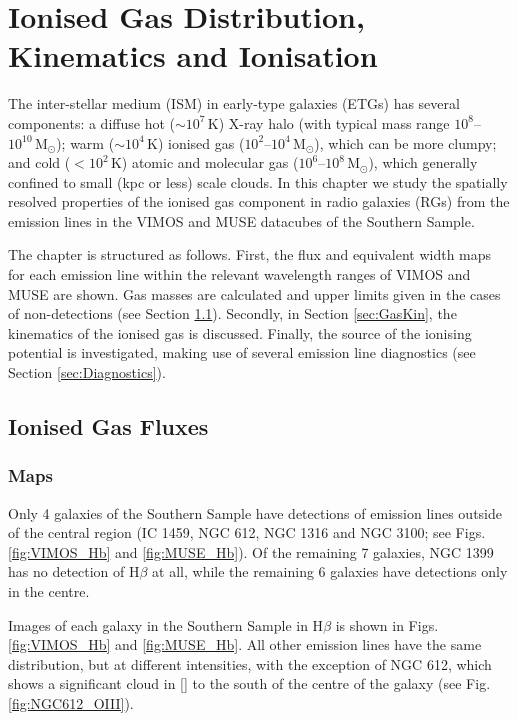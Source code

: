 \chapter{Ionised Gas Distribution, Kinematics and Ionisation}
	\label{cha:gas}
The inter-stellar medium (ISM) in early-type galaxies (ETGs) has several components: a diffuse hot ($\sim 10^7 \, \mathrm{K}$) X-ray halo (with typical mass range $10^8$--$10^{10} \, \mathrm{M_\odot}$); warm ($\sim 10^4 \, \mathrm{K}$) ionised gas ($10^2$--$10^4 \, \mathrm{M_\odot}$), which can be more clumpy; and cold ($<10^2 \, \mathrm{K}$) atomic and molecular gas ($10^6$--$10^8 \, \mathrm{M_\odot}$), which generally confined to small (kpc or less) scale clouds. In this chapter we study the spatially resolved properties of the ionised gas component in radio galaxies (RGs) from the emission lines in the VIMOS and MUSE datacubes of the Southern Sample.

The chapter is structured as follows. First, the flux and equivalent width maps for each emission line within the relevant wavelength ranges of VIMOS and MUSE are shown. Gas masses are calculated and upper limits given in the cases of non-detections (see Section \ref{sec:GasFlux}). Secondly, in Section \ref{sec:GasKin}, the kinematics of the ionised gas is discussed. Finally, the source of the ionising potential is investigated, making use of several emission line diagnostics (see Section \ref{sec:Diagnostics}).


\section{Ionised Gas Fluxes}
	\label{sec:GasFlux}
	\subsection{Maps}
		\label{subsec:GasMaps}
		Only 4 galaxies of the Southern Sample have detections of emission lines outside of the central region (IC 1459, NGC 612, NGC 1316 and NGC 3100; see Figs.\,\ref{fig:VIMOS_Hb} and \ref{fig:MUSE_Hb}).  Of the remaining 7 galaxies, NGC 1399 has no detection of H$\beta$ at all, while the remaining 6 galaxies have detections only in the centre. 

		Images of each galaxy in the Southern Sample in H$\beta$ is shown in Figs.\ref{fig:VIMOS_Hb} and \ref{fig:MUSE_Hb}. All other emission lines have the same distribution, but at different intensities, with the exception of NGC 612, which shows a significant cloud in [] to the south of the centre of the galaxy (see Fig.\,\ref{fig:NGC612_OIII}). 


